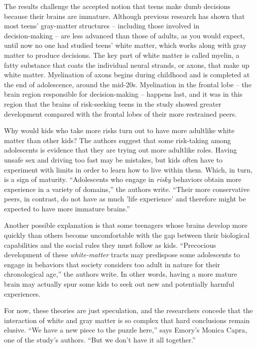 ﻿\documentclass[12pt]{article}
\begin{document}
The results challenge the accepted notion that teens make dumb decisions because their brains are
immature. Although previous research has shown that most teens' gray-matter structures -- including
those involved in \\decision-making -- are less advanced than those of adults, as you would expect,
until now no one had studied teens' white matter, which works along with gray matter to produce
decisions. The key part of white matter is called myelin, a fatty substance that coats the
individual neural strands, or axons, that make up white matter. Myelination of axons begins during
childhood and is completed at the end of adolescence, around the mid-20s. Myelination in the frontal
lobe -- the brain region responsible for decision-making -- happens last, and it was in this region
that the brains of risk-seeking teens in the study showed greater development compared with the
frontal lobes of their more restrained peers. 

Why would kids who take more risks turn out to have more adultlike white matter than other kids? The
authors suggest that some risk-taking among adolescents is evidence that they are trying out more
adultlike roles. Having unsafe sex and driving too fast may be mistakes, but kids often have to
experiment with limits in order to learn how to live within them. Which, in turn, is a sign of
maturity. ``Adolescents who engage in \emph{risky} behaviors obtain more experience in a variety of
domains,'' the authors write. ``Their more conservative peers, in contrast, do not have as much
'life experience' and therefore might be expected to have more immature brains.''

Another possible explanation is that some teenagers whose brains develop more quickly than others
become uncomfortable with the gap between their biological capabilities and the social rules they
must follow as kids. ``Precocious development of these \emph{white-matter} tracts may predispose
some adolescents to engage in behaviors that society considers too adult in nature for their
chronological age,'' the authors write. In other words, having a more mature brain may actually spur
some kids to seek out new and potentially harmful experiences.

For now, these theories are just speculation, and the researchers concede that the interaction of
white and gray matter is so complex that hard conclusions remain elusive. ``We have a new piece to
the puzzle here,'' says Emory's Monica Capra, one of the study's authors. ``But we don't have it all
together.''
\end{document}
